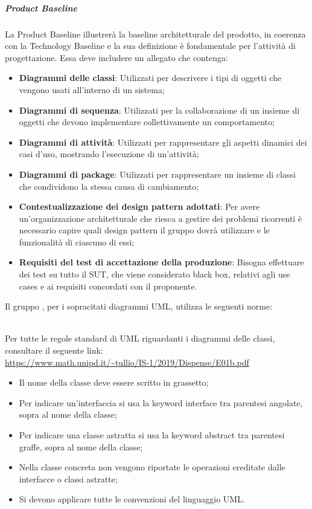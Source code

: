 \subparagraph*{Product Baseline}
La Product Baseline illustrerà la baseline architetturale del prodotto, in coerenza con la Technology Baseline e la sua definizione è fondamentale per l'attività di progettazione.
Essa deve includere un allegato che contenga:
\begin{itemize}
	\item \textbf{Diagrammi delle classi}: Utilizzati per descrivere i tipi di oggetti che vengono usati all'interno di un sistema;
	\item \textbf{Diagrammi di sequenza}: Utilizzati per la collaborazione di un insieme di oggetti che devono implementare collettivamente un comportamento;
	\item \textbf{Diagrammi di attività}: Utilizzati per rappresentare gli aspetti dinamici dei casi d'uso, mostrando l'esecuzione di un'attività;
	\item \textbf{Diagrammi di package}: Utilizzati per rappresentare un insieme di classi che condividono la stessa causa di cambiamento;
	\item \textbf{Contestualizzazione dei design pattern adottati}: Per avere un'organizzazione architetturale che riesca a gestire dei problemi ricorrenti è necessario capire quali design pattern il gruppo dovrà utilizzare e le funzionalità di ciascuno di essi;	
	\item \textbf{Requisiti del test di accettazione della produzione}: Bisogna effettuare dei test su tutto il SUT, che viene considerato black box, relativi agli use cases e ai requisiti concordati con il proponente.
\end{itemize}

Il gruppo \Gruppo{}, per i sopracitati diagrammi UML, utilizza le seguenti norme:
 
\mbox{}\\
Per tutte le regole standard di UML riguardanti i diagrammi delle classi, consultare il seguente link:
\\
 \url{https://www.math.unipd.it/~tullio/IS-1/2019/Dispense/E01b.pdf}
\begin{itemize}
	\item Il nome della classe deve essere scritto in grassetto;
	\item Per indicare un'interfaccia si usa la keyword interface tra parentesi angolate, sopra al nome della classe;
	\item Per indicare una classe astratta si usa la keyword abstract tra parentesi graffe, sopra al nome della classe;
	\item Nella classe concreta non vengono riportate le operazioni ereditate dalle interfacce o classi astratte;
	\item Si devono applicare tutte le convenzioni del linguaggio UML. 	
\end{itemize}

